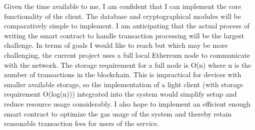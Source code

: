 \documentclass[]{report}
\begin{document}
Given the time available to me, I am confident that I can implement the core functionality of the client. The database and cryptographical modules will be comparatively simple to implement. I am anticipating that the actual process of writing the smart contract to handle transaction processing will be the largest challenge. In terms of goals I would like to reach but which may be more challenging, the current project uses a full local Ethereum node to communicate with the network. The storage requirement for a full node is O(n) where n is the number of transactions in the blockchain. This is impractical for devices with smaller available storage, so the implementation of a \gls{light client} (with storage requirement O(log(n))) integrated into the system would simplify setup and reduce resource usage considerably. I also hope to implement an efficient enough smart contract to optimize the gas usage of the system and thereby retain reasonable transaction fees for users of the service.

\listoffigures
\printindex
\printglossaries{}
\printbibliography{}
\end{document}
